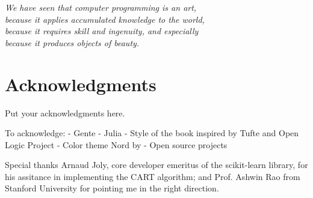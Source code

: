 
\begin{flushright}{\slshape
    We have seen that computer programming is an art, \\
    because it applies accumulated knowledge to the world, \\
    because it requires skill and ingenuity, and especially \\
    because it produces objects of beauty.} \\ \medskip
\end{flushright}



\bigskip

{
    \chapter*{Acknowledgments}
    Put your acknowledgments here.

    To acknowledge:
    - Gente
    - Julia
    - Style of the book inspired by Tufte and Open Logic Project
    - Color theme Nord by
    - Open source projects

    \bigskip

    Special thanks Arnaud Joly, core developer emeritus of the scikit-learn
    library, for his assitance in implementing the CART algorithm; and Prof.
    Ashwin Rao from Stanford University for pointing me in the right direction.
}